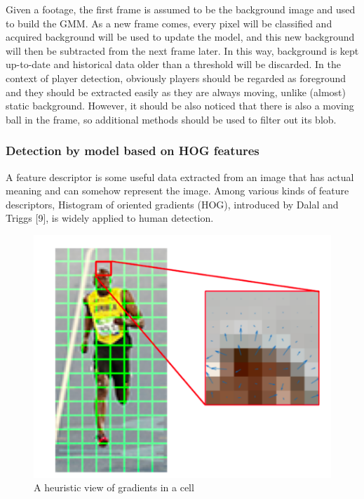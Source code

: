 \documentclass{article}
\begin{document}
Given a footage, the first frame is assumed to be the background image and used to build the GMM. As a new frame comes, every pixel will be classified and acquired background will be used to update the model, and this new  background will then be subtracted from the next frame later. In this way,  background is kept up-to-date and historical data older than a threshold will be discarded. 
In the context of player detection, obviously players should be regarded as foreground and they should be extracted easily as they are always moving, unlike (almost) static background. However, it should be also noticed that there is also a moving ball in the frame, so additional methods should be used to filter out its blob.\\
\subsubsection{Detection by model based on HOG features}
A feature descriptor is some useful data extracted from an image that has actual meaning and can somehow represent the image. Among various kinds of feature descriptors, Histogram of oriented gradients (HOG), introduced by Dalal and Triggs [9], is widely applied to human detection.\\
\begin{figure}
  \centering
  \includegraphics[scale=0.5]{report/pic/2/Sample_of_gradients.png}
  \caption{A heuristic view of gradients in a cell}
\end{figure}
\end{document}
